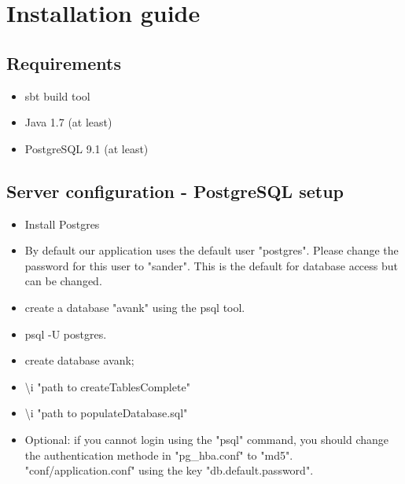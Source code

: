 \documentclass[11pt]{article}
\date{}
\begin{document}
\section{Installation guide}
\subsection{Requirements}
\begin{itemize}
\item sbt build tool
\item Java 1.7 (at least)
\item PostgreSQL 9.1 (at least)
\end{itemize}

\subsection{Server configuration - PostgreSQL setup}
\begin{itemize}
\item Install Postgres
\item  By default our application uses the default user "postgres". Please change the password for this user to "sander". This is the default for database access but can be changed.
\item create a database "avank" using the psql tool.
\item psql -U postgres.
\item create database avank;
\item \textbackslash i "path to createTablesComplete"
\item \textbackslash i "path to populateDatabase.sql"
\item  Optional: if you cannot login using the "psql" command, you should change the authentication methode in "pg\_hba.conf" to "md5". 
"conf/application.conf" using the key "db.default.password".
\end{itemize}
\end{document}
